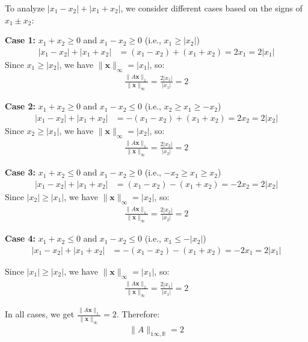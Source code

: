 To analyze $|x_1 - x_2| + |x_1 + x_2|$, we consider different cases based on the signs of $x_1 \pm x_2$:

\textbf{Case 1:} $x_1 + x_2 \geq 0$ and $x_1 - x_2 \geq 0$ (i.e., $x_1 \geq |x_2|$)
\begin{align*}
    |x_1 - x_2| + |x_1 + x_2| & = (x_1 - x_2) + (x_1 + x_2) = 2x_1 = 2|x_1|
\end{align*}
Since $x_1 \geq |x_2|$, we have $\|\mathbf{x}\|_\infty = |x_1|$, so:
\begin{align*}
    \frac{\|A\mathbf{x}\|_1}{\|\mathbf{x}\|_\infty} = \frac{2|x_1|}{|x_1|} = 2
\end{align*}

\textbf{Case 2:} $x_1 + x_2 \geq 0$ and $x_1 - x_2 \leq 0$ (i.e., $x_2 \geq x_1 \geq -x_2$)
\begin{align*}
    |x_1 - x_2| + |x_1 + x_2| & = -(x_1 - x_2) + (x_1 + x_2) = 2x_2 = 2|x_2|
\end{align*}
Since $x_2 \geq |x_1|$, we have $\|\mathbf{x}\|_\infty = |x_2|$, so:
\begin{align*}
    \frac{\|A\mathbf{x}\|_1}{\|\mathbf{x}\|_\infty} = \frac{2|x_2|}{|x_2|} = 2
\end{align*}

\textbf{Case 3:} $x_1 + x_2 \leq 0$ and $x_1 - x_2 \geq 0$ (i.e., $-x_2 \geq x_1 \geq x_2$)
\begin{align*}
    |x_1 - x_2| + |x_1 + x_2| & = (x_1 - x_2) - (x_1 + x_2) = -2x_2 = 2|x_2|
\end{align*}
Since $|x_2| \geq |x_1|$, we have $\|\mathbf{x}\|_\infty = |x_2|$, so:
\begin{align*}
    \frac{\|A\mathbf{x}\|_1}{\|\mathbf{x}\|_\infty} = \frac{2|x_2|}{|x_2|} = 2
\end{align*}

\textbf{Case 4:}
$x_1 + x_2 \leq 0$ and $x_1 - x_2 \leq 0$ (i.e., $x_1 \leq -|x_2|$)
\begin{align*}
    |x_1 - x_2| + |x_1 + x_2| & = -(x_1 - x_2) - (x_1 + x_2) = -2x_1 = 2|x_1|
\end{align*}

Since $|x_1| \geq |x_2|$, we have $\|\mathbf{x}\|_\infty = |x_1|$, so:
\begin{align*}
    \frac{\|A\mathbf{x}\|_1}{\|\mathbf{x}\|_\infty} = \frac{2|x_1|}{|x_1|} = 2
\end{align*}

In all cases, we get $\frac{\|A\mathbf{x}\|_1}{\|\mathbf{x}\|_\infty} = 2$. Therefore:
\begin{align*}
    \|A\|_{1\infty,\mathbb{R}} = 2
\end{align*}

